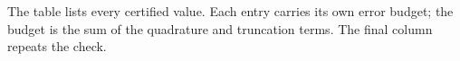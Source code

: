 The table lists every certified value.
Each entry carries its own error budget; the budget is the sum of the
quadrature and truncation terms. The final column repeats the check.
